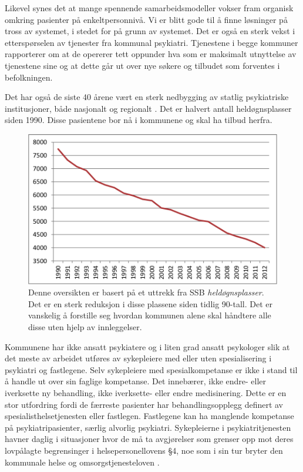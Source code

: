\documentclass[11pt]{report} %
\begin{document}
                  Likevel synes det at mange spennende samarbeidsmodeller vokser fram organisk omkring pasienter på enkeltpersonnivå. Vi er blitt gode til å finne løsninger på tross av systemet, i stedet for på grunn av systemet.
                  Det er også en sterk vekst i etterspørselen av tjenester fra kommunal psykiatri. Tjenestene i begge kommuner rapporterer om at de opererer tett oppunder hva som er maksimalt utnyttelse av tjenestene sine og at dette går ut over nye søkere og tilbudet som forventes i befolkningen.

                  Det har også de siste 40 årene vært en sterk nedbygging av statlig psykiatriske institusjoner, både nasjonalt og regionalt
                  \cite{SSButtrekk1}. Det er halvert antall heldøgnsplasser siden 1990. Disse pasientene bor nå i kommunene og skal ha tilbud herfra. 

                \begin{figure}[ht]
                  \centering
                  \includegraphics{./pix/heldgnpsykplass}
                  \caption[Oversikt over reduksjon i \textit{heldøgnsplasser}.]
                   {Denne oversikten er basert på et uttrekk fra SSB \textit{heldøgnsplasser}. Det er en sterk reduksjon i disse plassene siden tidlig 90-tall. Det er vanskelig å forstille seg hvordan kommunen alene skal håndtere alle disse uten hjelp av innleggelser.}
                \end{figure}  


                    Kommunene har ikke ansatt psykiatere og i liten grad ansatt psykologer slik at det meste av arbeidet utføres av sykepleiere med eller uten spesialisering i psykiatri og fastlegene. Selv sykepleiere med spesialkompetanse er ikke i stand til å handle ut over sin faglige kompetanse. Det innebærer, ikke endre- eller iverksette ny behandling, ikke iverksette- eller endre medisinering. Dette er en stor utfordring fordi de færreste pasienter har behandlingsopplegg definert av spesialisthelsetjenesten eller fastlegen. Fastlegene kan ha manglende kompetanse på psykiatripasienter, særlig alvorlig psykiatri. 
                    Sykepleierne i psykiatritjenesten havner daglig i situasjoner hvor de må ta avgjørelser som grenser opp mot deres lovpålagte begrensinger i helsepersonellovens §4, noe som i sin tur bryter den kommunale helse og omsorgstjenesteloven
                    \cite{HOTJL-12}.\\
\end{document}
